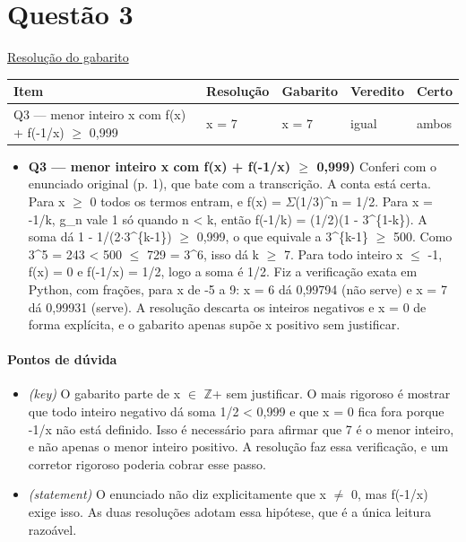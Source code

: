 \documentclass{article}%
\begin{document}
\section*{Questão 3}%
\href{https://poliedroresolve.sistemapoliedro.com.br/vestibulares/ime/2027/ime-2-fase-dia-1-26-10-2026-2-fase-dia-1/dissertativa-3-matematica-2-fase-dia-1-ime-2027}{Resolução do gabarito}\par\smallskip%
\begin{longtable}{@{}p{} p{} p{} p{} p{}@{}}\toprule Item & Resolução & Gabarito & Veredito & Certo \\ \midrule
Q3 --- menor inteiro x com f(x) + f(-1/x) $\geq$ 0,999 & x = 7 & x = 7 & igual & ambos \\
\bottomrule\end{longtable}%
\begin{itemize}%
\item%
\textbf{Q3 --- menor inteiro x com f(x) + f(-1/x) $\geq$ 0,999)} Conferi com o enunciado original (p. 1), que bate com a transcrição. A conta está certa. Para x $\geq$ 0 todos os termos entram, e f(x) = $\Sigma$(1/3)\^{}n = 1/2. Para x = -1/k, g\_n vale 1 só quando n < k, então f(-1/k) = (1/2)(1 - 3\^{}\{1-k\}). A soma dá 1 - 1/(2$\cdot$3\^{}\{k-1\}) $\geq$ 0,999, o que equivale a 3\^{}\{k-1\} $\geq$ 500. Como 3\^{}5 = 243 < 500 $\leq$ 729 = 3\^{}6, isso dá k $\geq$ 7. Para todo inteiro x $\leq$ -1, f(x) = 0 e f(-1/x) = 1/2, logo a soma é 1/2. Fiz a verificação exata em Python, com frações, para x de -5 a 9: x = 6 dá 0,99794 (não serve) e x = 7 dá 0,99931 (serve). A resolução descarta os inteiros negativos e x = 0 de forma explícita, e o gabarito apenas supõe x positivo sem justificar.%
\end{itemize}%
\paragraph{Pontos de dúvida}%
\begin{itemize}%
\item%
\textit{(key)} O gabarito parte de x $\in$ $\mathbb{Z}$+ sem justificar. O mais rigoroso é mostrar que todo inteiro negativo dá soma 1/2 < 0,999 e que x = 0 fica fora porque -1/x não está definido. Isso é necessário para afirmar que 7 é o menor inteiro, e não apenas o menor inteiro positivo. A resolução faz essa verificação, e um corretor rigoroso poderia cobrar esse passo.%
\item%
\textit{(statement)} O enunciado não diz explicitamente que x $\neq$ 0, mas f(-1/x) exige isso. As duas resoluções adotam essa hipótese, que é a única leitura razoável.%
\end{itemize}%
\end{document}
